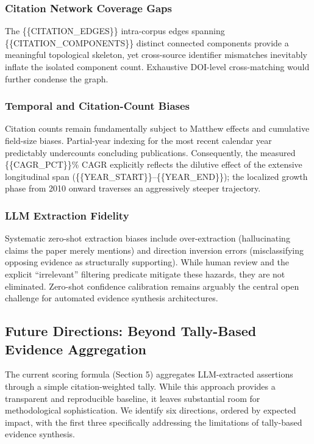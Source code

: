 \documentclass[
]{article}
\begin{document}
\subsubsection{Citation Network Coverage
Gaps}\label{citation-network-coverage-gaps}

The \{\{CITATION\_EDGES\}\} intra-corpus edges spanning
\{\{CITATION\_COMPONENTS\}\} distinct connected components provide a
meaningful topological skeleton, yet cross-source identifier mismatches
inevitably inflate the isolated component count. Exhaustive DOI-level
cross-matching would further condense the graph.

\subsubsection{Temporal and Citation-Count
Biases}\label{temporal-and-citation-count-biases}

Citation counts remain fundamentally subject to Matthew effects and
cumulative field-size biases. Partial-year indexing for the most recent
calendar year predictably undercounts concluding publications.
Consequently, the measured \{\{CAGR\_PCT\}\}\% CAGR explicitly reflects
the dilutive effect of the extensive longitudinal span
(\{\{YEAR\_START\}\}--\{\{YEAR\_END\}\}); the localized growth phase
from 2010 onward traverses an aggressively steeper trajectory.

\subsubsection{LLM Extraction Fidelity}\label{llm-extraction-fidelity}

Systematic zero-shot extraction biases include over-extraction
(hallucinating claims the paper merely mentions) and direction inversion
errors (misclassifying opposing evidence as structurally supporting).
While human review and the explicit ``irrelevant'' filtering predicate
mitigate these hazards, they are not eliminated. Zero-shot confidence
calibration remains arguably the central open challenge for automated
evidence synthesis architectures.

\subsection{Future Directions: Beyond Tally-Based Evidence
Aggregation}\label{future-directions-beyond-tally-based-evidence-aggregation}

The current scoring formula (Section 5) aggregates LLM-extracted
assertions through a simple citation-weighted tally. While this approach
provides a transparent and reproducible baseline, it leaves substantial
room for methodological sophistication. We identify six directions,
ordered by expected impact, with the first three specifically addressing
the limitations of tally-based evidence synthesis.
\end{document}
